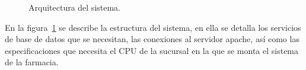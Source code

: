 \begin{figure}[htbp!]
	\begin{center}
		\caption{Arquitectura del sistema.}
		\label{fig:arquitectura}
	\end{center}
\end{figure}

En la figura~\ref{fig:arquitectura} se describe la estructura del sistema, en ella se detalla los servicios de base de datos que se necesitan, las conexiones al servidor apache, así como las especificaciones que necesita el CPU de la sucursal en la que se monta el sistema de la farmacia.



